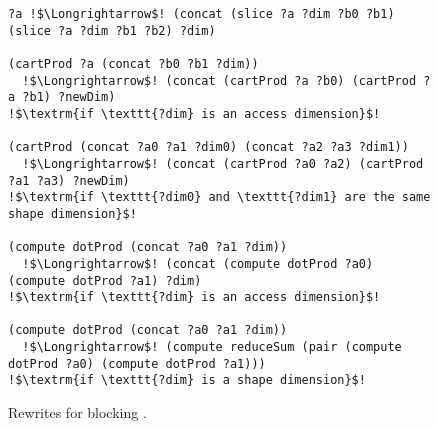 \begin{figure}
\begin{lstlisting}[escapechar=!]
?a !$\Longrightarrow$! (concat (slice ?a ?dim ?b0 ?b1) (slice ?a ?dim ?b1 ?b2) ?dim)
               
(cartProd ?a (concat ?b0 ?b1 ?dim)) 
  !$\Longrightarrow$! (concat (cartProd ?a ?b0) (cartProd ?a ?b1) ?newDim)
!$\textrm{if \texttt{?dim} is an access dimension}$!
 
(cartProd (concat ?a0 ?a1 ?dim0) (concat ?a2 ?a3 ?dim1)) 
  !$\Longrightarrow$! (concat (cartProd ?a0 ?a2) (cartProd ?a1 ?a3) ?newDim)
!$\textrm{if \texttt{?dim0} and \texttt{?dim1} are the same shape dimension}$!

(compute dotProd (concat ?a0 ?a1 ?dim)) 
  !$\Longrightarrow$! (concat (compute dotProd ?a0) (compute dotProd ?a1) ?dim)
!$\textrm{if \texttt{?dim} is an access dimension}$!

(compute dotProd (concat ?a0 ?a1 ?dim)) 
  !$\Longrightarrow$! (compute reduceSum (pair (compute dotProd ?a0) (compute dotProd ?a1)))
!$\textrm{if \texttt{?dim} is a shape dimension}$!
\end{lstlisting}
\vspace{-1em}
\caption{
Rewrites for blocking .
}
\label{fig:all-blocking-rewrites}
\end{figure}

